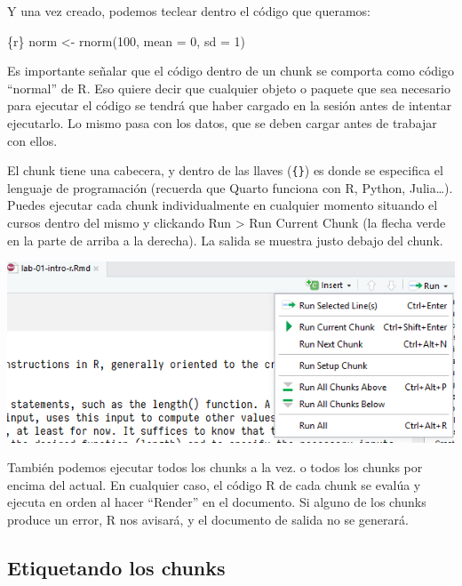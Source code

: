 \documentclass[
  letterpaper,
  DIV=11,
  numbers=noendperiod]{scrreprt}
\newenvironment{Shaded}{\begin{snugshade}}{\end{snugshade}}
\newcommand{\AttributeTok}[1]{\textcolor[rgb]{0.40,0.45,0.13}{#1}}
\newcommand{\DecValTok}[1]{\textcolor[rgb]{0.68,0.00,0.00}{#1}}
\newcommand{\FunctionTok}[1]{\textcolor[rgb]{0.28,0.35,0.67}{#1}}
\newcommand{\InformationTok}[1]{\textcolor[rgb]{0.37,0.37,0.37}{#1}}
\newcommand{\NormalTok}[1]{\textcolor[rgb]{0.00,0.23,0.31}{#1}}
\newcommand{\OtherTok}[1]{\textcolor[rgb]{0.00,0.23,0.31}{#1}}
\begin{document}
Y una vez creado, podemos teclear dentro el código que queramos:

\begin{Shaded}
\begin{Highlighting}[]
\InformationTok{\textasciigrave{}\textasciigrave{}\textasciigrave{}\{r\}}
\NormalTok{ norm }\OtherTok{\textless{}{-}} \FunctionTok{rnorm}\NormalTok{(}\DecValTok{100}\NormalTok{, }\AttributeTok{mean =} \DecValTok{0}\NormalTok{, }\AttributeTok{sd =} \DecValTok{1}\NormalTok{)}
 \InformationTok{\textasciigrave{}\textasciigrave{}\textasciigrave{}}
\end{Highlighting}
\end{Shaded}

Es importante señalar que el código dentro de un chunk se comporta como
código ``normal'' de R. Eso quiere decir que cualquier objeto o paquete
que sea necesario para ejecutar el código se tendrá que haber cargado en
la sesión antes de intentar ejecutarlo. Lo mismo pasa con los datos, que
se deben cargar antes de trabajar con ellos.

El chunk tiene una cabecera, y dentro de las llaves (\texttt{\{\}}) es
donde se especifica el lenguaje de programación (recuerda que Quarto
funciona con R, Python, Julia\ldots). Puedes ejecutar cada chunk
individualmente en cualquier momento situando el cursos dentro del mismo
y clickando Run \textgreater{} Run Current Chunk (la flecha verde en la
parte de arriba a la derecha). La salida se muestra justo debajo del
chunk.

\includegraphics{images/02-intro-rmarkdown/run_one_chunk.png}

También podemos ejecutar todos los chunks a la vez. o todos los chunks
por encima del actual. En cualquier caso, el código R de cada chunk se
evalúa y ejecuta en orden al hacer ``Render'' en el documento. Si alguno
de los chunks produce un error, R nos avisará, y el documento de salida
no se generará.

\hypertarget{etiquetando-los-chunks}{%
\subsection{Etiquetando los chunks}\label{etiquetando-los-chunks}}
\end{document}
